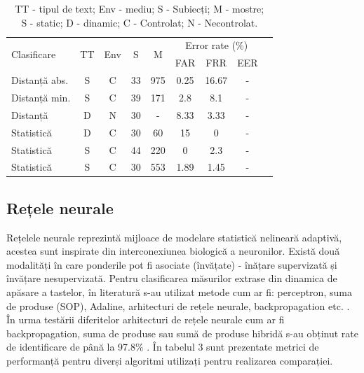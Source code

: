 \documentclass[9pt,shortpaper,twoside,web]{ieeecolor}
\begin{document}
\begin{table}[H]
	\begin{tabular}[c]{lcccccccc}
	\hline
	\multirow{2}{*}{Clasificare} & \multirow{2}{*}{TT} & \multirow{2}{*}{Env} & \multirow{2}{*}{S} & \multirow{2}{*}{M} & \multicolumn{3}{c}{Error rate (\%)} \\
	\cline{6-8}
            &    &     &   &   &  FAR & FRR & EER \\
	\hline
	Distanță abs. & S & C & 33 & 975 & 0.25 & 16.67 & - \\
	Distanță min. & S & C & 39 & 171 & 2.8  &  8.1  & - \\
	Distanță      & D & N & 30 &  -  & 8.33 &  3.33 & - \\
	Statistică    & D & C & 30 & 60  &15    &  0    & - \\
	Statistică    & S & C & 44 &220  & 0    &  2.3  & - \\
	Statistică    & S & C & 30 &553  & 1.89 &  1.45 & - \\
	\hline
	\end{tabular}
	
\caption{
TT - tipul de text; Env - mediu; S - Subiecți; M - mostre;
\\
S - static; D - dinamic; C - Controlat; N - Necontrolat.}
\end{table}

\subsection{Rețele neurale}
	Rețelele neurale reprezintă mijloace de modelare statistică nelineară adaptivă, acestea sunt inspirate din interconexiunea biologică a neuronilor. Există două modalități în care ponderile pot fi asociate (învățate) - înățare supervizată și învățare nesupervizată. Pentru clasificarea măsurilor extrase din dinamica de apăsare a tastelor, în literatură s-au utilizat metode cum ar fi: perceptron, suma de produse (SOP), Adaline, arhitecturi de rețele neurale, backpropagation etc. \cite{b3}.
	În urma testării diferitelor arhitecturi de rețele neurale cum ar fi backpropagation, suma de produse sau sumă de produse hibridă s-au obținut rate de identificare de până la 97.8\% \cite{b3}. În tabelul 3 sunt prezentate metrici de performanță pentru diverși algoritmi utilizați pentru realizarea comparației.
\\
\end{document}
